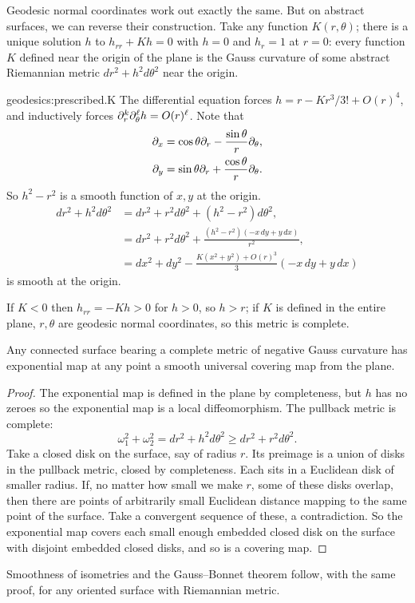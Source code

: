Geodesic normal coordinates work out exactly the same.
But on abstract surfaces, we can reverse their construction.
Take any function \(K(r,\theta)\); there is a unique solution \(h\) to \(h_{rr}+Kh=0\) with \(h=0\) and \(h_r=1\) at \(r=0\): every function \(K\) defined near the origin of the plane is the Gauss curvature of some abstract Riemannian metric \(dr^2 + h^2d\theta^2\) near the origin.
\begin{answer}{geodesics:prescribed.K}
The differential equation forces \(h=r-Kr^3/3!+O(r)^4\), and inductively forces \(\partial_{r}^k\partial_{\theta}^{\ell} h=O(r)^{\ell}\).
Note that
\begin{align*}
\partial_{x}&=\cos\theta\partial_{r}-\frac{\sin\theta}{r}\partial_{\theta},\\
\partial_{y}&=\sin\theta\partial_{r}+\frac{\cos\theta}{r}\partial_{\theta}.
\end{align*}
So \(h^2-r^2\) is a smooth function of \(x,y\) at the origin.
\begin{align*}
dr^2+h^2d\theta^2
&=
dr^2+r^2d\theta^2+(h^2-r^2)d\theta^2,
\\
&=
dr^2+r^2d\theta^2+\frac{(h^2-r^2)(-x\,dy+y\,dx)}{r^2},
\\
&=
dx^2+dy^2-\frac{K(x^2+y^2)+O(r)^3}{3}(-x\,dy+y\,dx)
\end{align*}
is smooth at the origin.
\end{answer}
If \(K<0\) then \(h_{rr}=-Kh>0\) for \(h>0\), so \(h>r\); if \(K\) is defined in the entire plane, \(r,\theta\) are geodesic normal coordinates, so this metric is complete.
\begin{theorem}\label{theorem:complete.negative.Gauss}
Any connected surface bearing a complete metric of negative Gauss curvature has exponential map at any point a smooth universal covering map from the plane.
\end{theorem}
\begin{proof}
The exponential map is defined in the plane by completeness, but \(h\) has no zeroes so the exponential map is a local diffeomorphism.
The pullback metric is complete:
\[
\omega_1^2+\omega_2^2=dr^2+h^2d\theta^2\ge dr^2+r^2d\theta^2.
\]
Take a closed disk on the surface, say of radius \(r\).
Its preimage is a union of disks in the pullback metric, closed by completeness.
Each sits in a Euclidean disk of smaller radius.
If,  no matter how small we make \(r\), some of these disks overlap, then there are points of arbitrarily small Euclidean distance mapping to the same point of the surface.
Take a convergent sequence of these, a contradiction.
So the exponential map covers each small enough embedded closed disk on the surface with disjoint embedded closed disks, and so is a covering map.
\end{proof}

Smoothness of isometries and the Gauss--Bonnet theorem follow, with the same proof, for any oriented surface with Riemannian metric.

